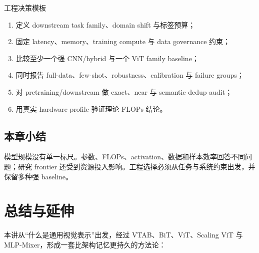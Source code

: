 \documentclass[a4paper]{article}
\begin{document}
\begin{importantbox}{工程决策模板}
\begin{enumerate}
  \item 定义 downstream task family、domain shift 与标签预算；
  \item 固定 latency、memory、training compute 与 data governance 约束；
  \item 比较至少一个强 CNN/hybrid 与一个 ViT family baseline；
  \item 同时报告 full-data、few-shot、robustness、calibration 与 failure groups；
  \item 对 pretraining/downstream 做 exact、near 与 semantic dedup audit；
  \item 用真实 hardware profile 验证理论 FLOPs 结论。
\end{enumerate}
\end{importantbox}

\subsection{本章小结}

模型规模没有单一标尺。参数、FLOPs、activation、数据和样本效率回答不同问题；研究 frontier 还受到资源投入影响。工程选择必须从任务与系统约束出发，并保留多种强 baseline。

\section{总结与延伸}

本讲从“什么是通用视觉表示”出发，经过 VTAB、BiT、ViT、Scaling ViT 与 MLP-Mixer，形成一套比架构记忆更持久的方法论：
\end{document}
